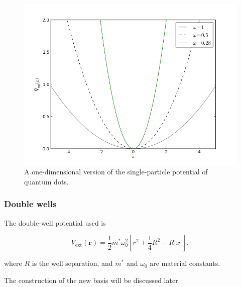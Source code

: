 \begin{frame}
 \begin{figure}
 \begin{center}
  \includegraphics[scale=0.4]{../graphics/Potentials/qdots.png}
  \caption{A one-dimensional version of the single-particle potential of quantum dots.}
  \label{fig:extPotQDOTS}
 \end{center}
\end{figure}
\end{frame}

\begin{frame}
 \frametitle{Double wells}
 
 The double-well potential used is
 
 \begin{equation}
  V_\mathrm{ext}(\mathbf{r}) = \frac{1}{2}m^\ast \omega_0^2 \left[r^2 + \frac{1}{4}R^2 - R|x|\right], 
 \end{equation}

 where $R$ is the well separation, and $m^\ast$ and $\omega_0$ are material constants.
 \shift
 
 The construction of the new basis will be discussed later.
 
\end{frame}

